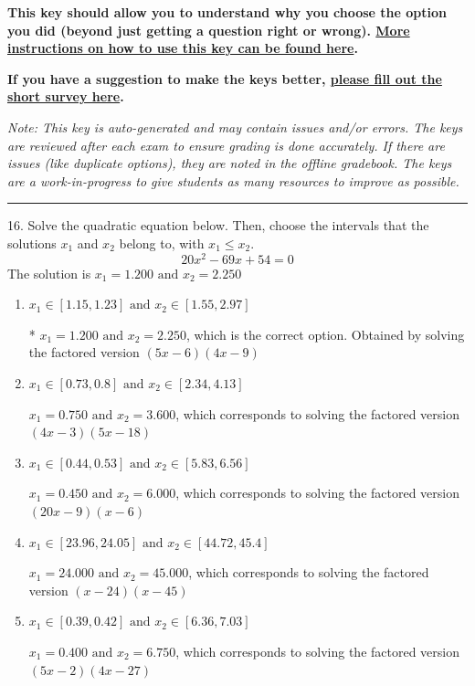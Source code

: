 \documentclass{article}[14pt]
\begin{document}
\textbf{This key should allow you to understand why you choose the option you did (beyond just getting a question right or wrong). \href{https://xronos.clas.ufl.edu/mac1105spring2020/courseDescriptionAndMisc/Exams/LearningFromResults}{More instructions on how to use this key can be found here}.}

\textbf{If you have a suggestion to make the keys better, \href{https://forms.gle/CZkbZmPbC9XALEE88}{please fill out the short survey here}.}

\textit{Note: This key is auto-generated and may contain issues and/or errors. The keys are reviewed after each exam to ensure grading is done accurately. If there are issues (like duplicate options), they are noted in the offline gradebook. The keys are a work-in-progress to give students as many resources to improve as possible.}

\rule{\textwidth}{0.4pt}

16. Solve the quadratic equation below. Then, choose the intervals that the solutions $x_1$ and $x_2$ belong to, with $x_1 \leq x_2$.
$$ 20x^{2} -69 x + 54 = 0 $$ 
The solution is $ x_1 = 1.200 \text{ and } x_2 = 2.250 $ 

\begin{enumerate}[label=\Alph*.] 
\item $ x_1 \in [1.15, 1.23] \text{ and } x_2 \in [1.55, 2.97] $ 

 * $x_1 = 1.200 \text{ and } x_2 = 2.250$, which is the correct option. Obtained by solving the factored version $(5x -6)(4x -9)$ 
\item $ x_1 \in [0.73, 0.8] \text{ and } x_2 \in [2.34, 4.13] $ 

 $x_1 = 0.750 \text{ and } x_2 = 3.600$, which corresponds to solving the factored version $(4x -3)(5x -18)$ 
\item $ x_1 \in [0.44, 0.53] \text{ and } x_2 \in [5.83, 6.56] $ 

 $x_1 = 0.450 \text{ and } x_2 = 6.000$, which corresponds to solving the factored version $(20x -9)(x -6)$ 
\item $ x_1 \in [23.96, 24.05] \text{ and } x_2 \in [44.72, 45.4] $ 

 $x_1 = 24.000 \text{ and } x_2 = 45.000$, which corresponds to solving the factored version $(x -24)(x -45)$ 
\item $ x_1 \in [0.39, 0.42] \text{ and } x_2 \in [6.36, 7.03] $ 

 $x_1 = 0.400 \text{ and } x_2 = 6.750$, which corresponds to solving the factored version $(5x -2)(4x -27)$ 
\end{enumerate} 
 
\end{document}

